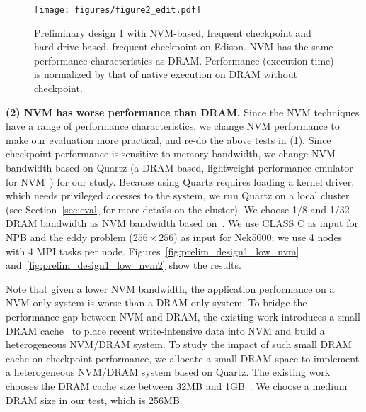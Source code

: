 \begin{figure}
\centering
\texttt{[image: figures/figure2\_edit.pdf]}
\vspace{-20pt}
\caption{Preliminary design 1 with NVM-based, frequent checkpoint and hard drive-based, frequent checkpoint on Edison. NVM has the same performance characteristics as DRAM. Performance (execution time) is normalized by that of native execution on DRAM without checkpoint.}
\label{fig:prelim_design1}
\vspace{-15pt}
\end{figure}


\textbf{(2) NVM has worse performance than DRAM.}
Since the NVM techniques have a range of performance characteristics,
we change NVM performance to make our evaluation more practical, and re-do the above tests in (1). 
Since checkpoint performance is sensitive to memory bandwidth, we change NVM bandwidth based on Quartz (a DRAM-based, lightweight performance emulator for NVM~\cite{middleware15:volos}) for our study. Because using Quartz requires loading a kernel driver, which needs privileged accesses to the system, we run Quartz on a local cluster (see Section~\ref{sec:eval} for more details on the cluster). 
We choose 1/8 and 1/32 DRAM bandwidth as NVM bandwidth based on~\cite{eurosys16:dulloor, NVMDB}.
We use CLASS C as input for NPB and the eddy problem ($256\times256$) as input for Nek5000; we use 4 nodes with 4 MPI tasks per node.
Figures~\ref{fig:prelim_design1_low_nvm} and~\ref{fig:prelim_design1_low_nvm2} show the results. %

Note that given a lower NVM bandwidth, the application performance on a NVM-only system is worse than a DRAM-only system.
To bridge the performance gap between NVM and DRAM, the existing work 
introduces a small DRAM cache~\cite{pm_iccd14,Ramos:ics11, eurosys16:dulloor} to place recent write-intensive data into NVM and build
a heterogeneous NVM/DRAM system.
To study the impact of such small DRAM cache on checkpoint performance,
we allocate a small DRAM space to implement a heterogeneous NVM/DRAM system based on Quartz.
The existing work chooses the DRAM cache size between 32MB and 1GB~\cite{pm_iccd14,Ramos:ics11, eurosys16:dulloor, gpu_pcm_pact13, ieee_micro11:jiang, dac09_pdram, hpdc16:wu}.
We choose a medium DRAM size in our test, which is 256MB.

